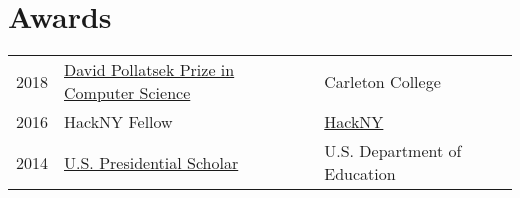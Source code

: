 \documentclass{resume}
\begin{document}
\begin{minipage}[t]{0.66\textwidth}

\section{Awards}
\begin{tabular}{rll}
  2018 & \href{https://apps.carleton.edu/curricular/cs/major/awards/pollatsek/}{David Pollatsek Prize in Computer Science} & Carleton College \\
  2016 & HackNY Fellow & \href{https://apply.hackny.org}{HackNY} \\
  2014 & \href{https://en.wikipedia.org/wiki/Presidential_Scholars_Program}{U.S. Presidential Scholar} & U.S. Department of Education \\
\end{tabular}
\sectionsep

\end{minipage}
\end{document}
